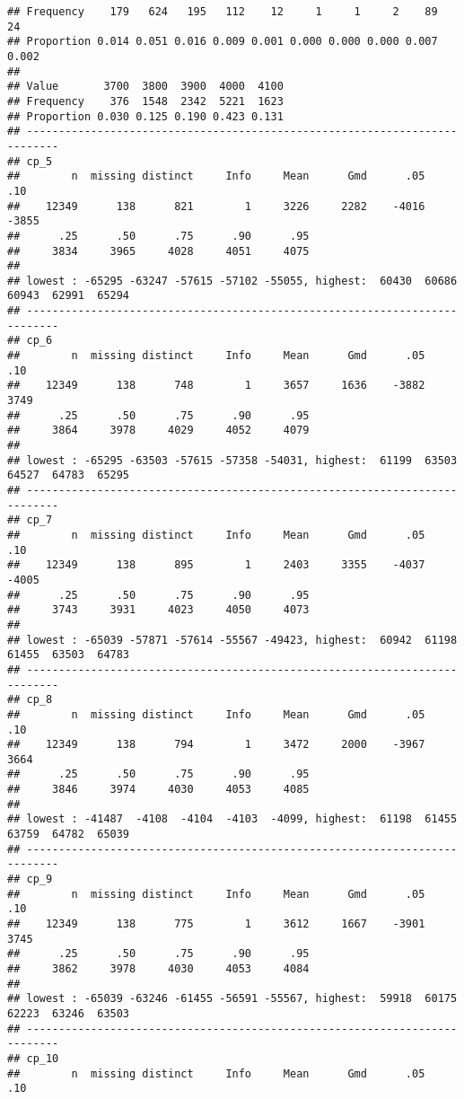 \documentclass[]{article}
\begin{document}
\begin{verbatim}
## Frequency    179   624   195   112    12     1     1     2    89    24
## Proportion 0.014 0.051 0.016 0.009 0.001 0.000 0.000 0.000 0.007 0.002
##                                         
## Value       3700  3800  3900  4000  4100
## Frequency    376  1548  2342  5221  1623
## Proportion 0.030 0.125 0.190 0.423 0.131
## ---------------------------------------------------------------------------
## cp_5 
##        n  missing distinct     Info     Mean      Gmd      .05      .10 
##    12349      138      821        1     3226     2282    -4016    -3855 
##      .25      .50      .75      .90      .95 
##     3834     3965     4028     4051     4075 
## 
## lowest : -65295 -63247 -57615 -57102 -55055, highest:  60430  60686  60943  62991  65294
## ---------------------------------------------------------------------------
## cp_6 
##        n  missing distinct     Info     Mean      Gmd      .05      .10 
##    12349      138      748        1     3657     1636    -3882     3749 
##      .25      .50      .75      .90      .95 
##     3864     3978     4029     4052     4079 
## 
## lowest : -65295 -63503 -57615 -57358 -54031, highest:  61199  63503  64527  64783  65295
## ---------------------------------------------------------------------------
## cp_7 
##        n  missing distinct     Info     Mean      Gmd      .05      .10 
##    12349      138      895        1     2403     3355    -4037    -4005 
##      .25      .50      .75      .90      .95 
##     3743     3931     4023     4050     4073 
## 
## lowest : -65039 -57871 -57614 -55567 -49423, highest:  60942  61198  61455  63503  64783
## ---------------------------------------------------------------------------
## cp_8 
##        n  missing distinct     Info     Mean      Gmd      .05      .10 
##    12349      138      794        1     3472     2000    -3967     3664 
##      .25      .50      .75      .90      .95 
##     3846     3974     4030     4053     4085 
## 
## lowest : -41487  -4108  -4104  -4103  -4099, highest:  61198  61455  63759  64782  65039
## ---------------------------------------------------------------------------
## cp_9 
##        n  missing distinct     Info     Mean      Gmd      .05      .10 
##    12349      138      775        1     3612     1667    -3901     3745 
##      .25      .50      .75      .90      .95 
##     3862     3978     4030     4053     4084 
## 
## lowest : -65039 -63246 -61455 -56591 -55567, highest:  59918  60175  62223  63246  63503
## ---------------------------------------------------------------------------
## cp_10 
##        n  missing distinct     Info     Mean      Gmd      .05      .10 

\end{verbatim}
\end{document}
